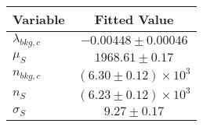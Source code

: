 \begin{tabular}[t]{lc}
\hline
Variable &Fitted Value\\
\hline\hline
$\lambda_{bkg,c}$&$-0.00448\pm0.00046$\\
\hline
$\mu_{S}$&$1968.61\pm0.17$\\
\hline
$n_{bkg,c}$&$(6.30\pm0.12)\times 10^3$\\
\hline
$n_{S}$&$(6.23\pm0.12)\times 10^3$\\
\hline
$\sigma_{S}$&$9.27\pm0.17$\\
\hline
\end{tabular}